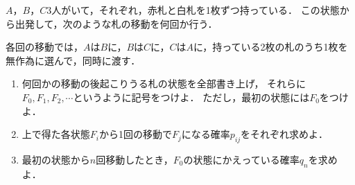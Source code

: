 \documentclass[../../main.tex]{subfiles}
\begin{document}
$A$，$B$，$C$3人がいて，それぞれ，赤札と白札を1枚ずつ持っている．
この状態から出発して，次のような札の移動を何回か行う．

各回の移動では，$A$は$B$に，$B$は$C$に，$C$は$A$に，持っている2枚の札のうち1枚を無作為に選んで，同時に渡す．
\begin{enumerate}
  \item 何回かの移動の後起こりうる札の状態を全部書き上げ，
    それらに$F_0,F_1,F_2,\cdots$というように記号をつけよ．
    ただし，最初の状態には$F_0$をつけよ．
  \item 上で得た各状態$F_i$から1回の移動で$F_j$になる確率$p_{ij}$をそれぞれ求めよ．
  \item 最初の状態から$n$回移動したとき，$F_0$の状態にかえっている確率$q_n$を求めよ．
\end{enumerate}
\end{document}
